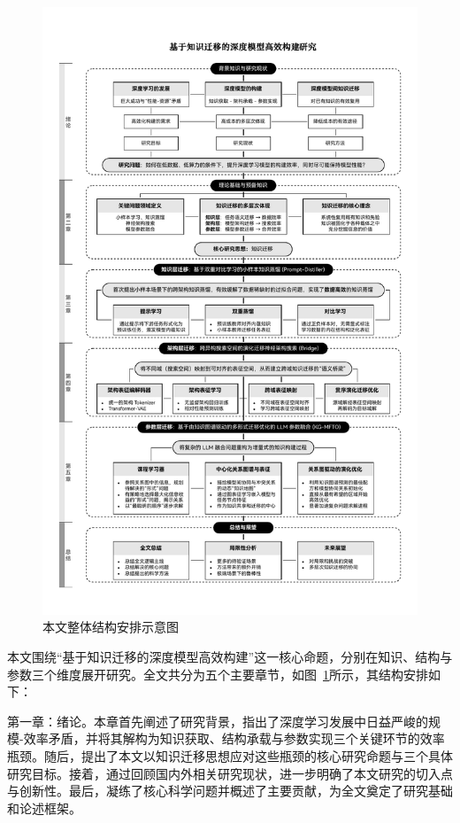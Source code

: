 \documentclass[../main.tex]{subfiles}
\begin{document}
\label{sec:organization-of-the-thesis}

\begin{figure}[t]
	\centering
	\includegraphics[width=\linewidth]{overall_struction.pdf}
	\caption{本文整体结构安排示意图}\label{fig:overall_structure}
\end{figure}

本文围绕“基于知识迁移的深度模型高效构建”这一核心命题，分别在知识、结构与参数三个维度展开研究。全文共分为五个主要章节，如图~\ref{fig:overall_structure}所示，其结构安排如下：

第一章：绪论。本章首先阐述了研究背景，指出了深度学习发展中日益严峻的规模-效率矛盾，并将其解构为知识获取、结构承载与参数实现三个关键环节的效率瓶颈。随后，提出了本文以知识迁移思想应对这些瓶颈的核心研究命题与三个具体研究目标。接着，通过回顾国内外相关研究现状，进一步明确了本文研究的切入点与创新性。最后，凝练了核心科学问题并概述了主要贡献，为全文奠定了研究基础和论述框架。
\end{document}
